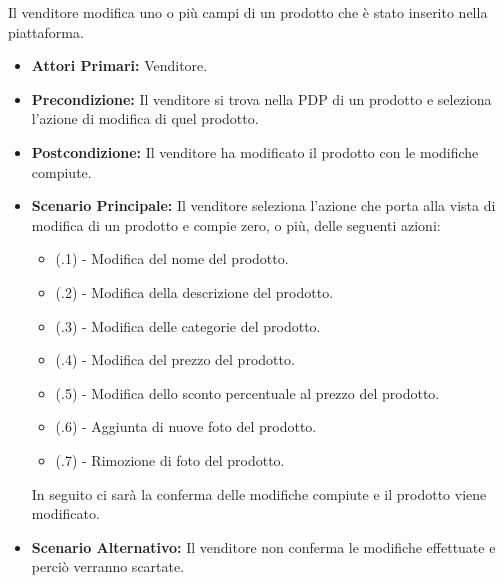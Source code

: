 Il venditore modifica uno o più campi di un prodotto che è stato inserito nella piattaforma.
\begin{itemize}
    \item \textbf{Attori Primari:} Venditore.
    \item \textbf{Precondizione:} Il venditore si trova nella PDP di un prodotto e seleziona l'azione di modifica di quel prodotto.
    \item \textbf{Postcondizione:} Il venditore ha modificato il prodotto con le modifiche compiute.
    \item \textbf{Scenario Principale:} Il venditore seleziona l'azione che porta alla vista di modifica di un prodotto e compie zero, o più, delle seguenti azioni:
    \begin{itemize}
        \item (\actualUC.1) - Modifica del nome del prodotto.
        \item (\actualUC.2) - Modifica della descrizione del prodotto.
        \item (\actualUC.3) - Modifica delle categorie del prodotto.
        \item (\actualUC.4) - Modifica del prezzo del prodotto.
        \item (\actualUC.5) - Modifica dello sconto percentuale al prezzo del prodotto.
        \item (\actualUC.6) - Aggiunta di nuove foto del prodotto.
        \item (\actualUC.7) - Rimozione di foto del prodotto.
    \end{itemize}
    In seguito ci sarà la conferma delle modifiche compiute e il prodotto viene modificato.
    \item \textbf{Scenario Alternativo:} Il venditore non conferma le modifiche effettuate e perciò verranno scartate.
\end{itemize}

\resetSubUC

